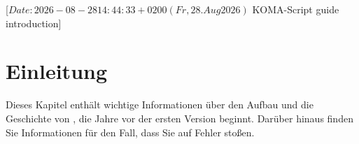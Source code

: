 %
%
%
%
%
%
%

                 [$Date: 2026-08-28 14:44:33 +0200 (Fr, 28. Aug 2026) $
                  KOMA-Script guide introduction]

\chapter{Einleitung}

Dieses Kapitel enthält wichtige Informationen über
den Aufbau  und die Geschichte von
\KOMAScript, die Jahre vor der ersten Version beginnt. Darüber hinaus finden
Sie Informationen für den Fall, dass Sie %
%
auf Fehler stoßen.

